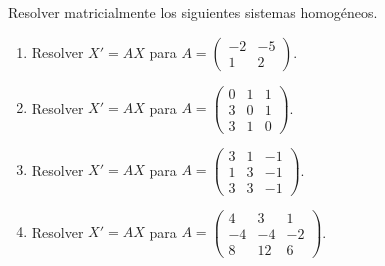Resolver matricialmente los siguientes sistemas homogéneos.

\begin{enumerate}[label=(\alph*),ref=\alph*,leftmargin=*]
\item Resolver \(X'=AX\) para \(A=\begin{pmatrix}-2&-5\\1&2\end{pmatrix}\).
\item Resolver \(X'=AX\) para \(A=\begin{pmatrix}0&1&1\\3&0&1\\3&1&0\end{pmatrix}\).
\item Resolver \(X'=AX\) para \(A=\begin{pmatrix}3&1&-1\\1&3&-1\\3&3&-1\end{pmatrix}\).
\item Resolver \(X'=AX\) para \(A=\begin{pmatrix}4&3&1\\-4&-4&-2\\8&12&6\end{pmatrix}\).
\end{enumerate}
